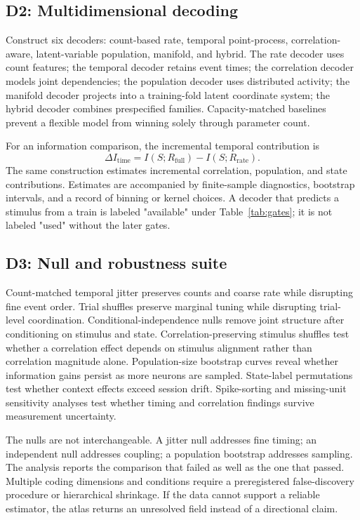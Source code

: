 \documentclass[conference]{IEEEtran}
\begin{document}
\subsection{D2: Multidimensional decoding}
Construct six decoders: count-based rate, temporal point-process, correlation-aware, latent-variable population, manifold, and hybrid. The rate decoder uses count features; the temporal decoder retains event times; the correlation decoder models joint dependencies; the population decoder uses distributed activity; the manifold decoder projects into a training-fold latent coordinate system; the hybrid decoder combines prespecified families. Capacity-matched baselines prevent a flexible model from winning solely through parameter count.

For an information comparison, the incremental temporal contribution is
\begin{equation}
\Delta I_{\mathrm{time}}=I(S;R_{\mathrm{full}})-I(S;R_{\mathrm{rate}}).
\end{equation}
The same construction estimates incremental correlation, population, and state contributions. Estimates are accompanied by finite-sample diagnostics, bootstrap intervals, and a record of binning or kernel choices. A decoder that predicts a stimulus from a train is labeled "available" under Table~\ref{tab:gates}; it is not labeled "used" without the later gates.

\subsection{D3: Null and robustness suite}
Count-matched temporal jitter preserves counts and coarse rate while disrupting fine event order. Trial shuffles preserve marginal tuning while disrupting trial-level coordination. Conditional-independence nulls remove joint structure after conditioning on stimulus and state. Correlation-preserving stimulus shuffles test whether a correlation effect depends on stimulus alignment rather than correlation magnitude alone. Population-size bootstrap curves reveal whether information gains persist as more neurons are sampled. State-label permutations test whether context effects exceed session drift. Spike-sorting and missing-unit sensitivity analyses test whether timing and correlation findings survive measurement uncertainty.

The nulls are not interchangeable. A jitter null addresses fine timing; an independent null addresses coupling; a population bootstrap addresses sampling. The analysis reports the comparison that failed as well as the one that passed. Multiple coding dimensions and conditions require a preregistered false-discovery procedure or hierarchical shrinkage. If the data cannot support a reliable estimator, the atlas returns an unresolved field instead of a directional claim.
\end{document}
